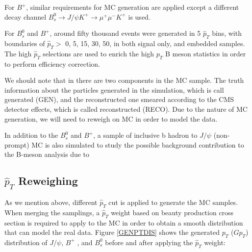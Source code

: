 For $B^+$, similar requirements for MC generation are applied except a different decay channel $B^0_s \rightarrow J/\psi K^+ \rightarrow \mu^+\mu^-K^+$ is used.

For $B^0_s$ and $B^+$, around fifty thousand events were generated in 5 $\hat{p}_{T}$ bins, with boundaries of $\hat{p}_{T} >$ 0, 5, 15, 30, 50, in both signal only, and embedded samples. The high $\hat{p}_{T}$ selections are used to enrich the high $p_T$ B meson statistics in order to perform efficiency correction. 

We should note that in there are two components in the MC sample. The truth information about the particles generated in the simulation, which is call generated (GEN), and the reconstructed one smeared according to the CMS detector effects, which is called reconstructed (RECO). Due to the nature of MC generation, we will need to reweigh on MC in order to model the data.

In addition to the $B^0_s$ and $B^+$, a sample of inclusive b hadron to $J/\psi$ (non-prompt) MC is also simulated to study the possible background contribution to the B-meson analysis due to 


\subsection{$\hat{p}_{T}$ Reweighing}


As we mention above, different $\hat{p}_{T}$ cut is applied to generate the MC samples. When merging the samplings, a  $\hat{p}_{T}$ weight based on beauty production cross section is required to apply to the MC in order to obtain a smooth distribution that can model the real data. Figure \ref{GENPTDIS} shows the generated $p_T$ ($Gp_T$) distribution of $J/\psi$, $B^+$ , and $B^0_s$ before and after applying the $\hat{p}_{T}$ weight:


